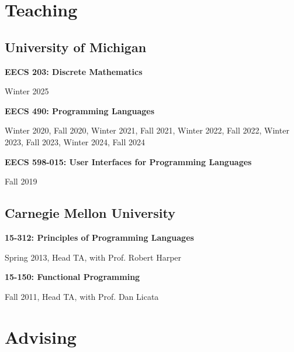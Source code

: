 \documentclass[10pt,letterpaper]{article}
\renewenvironment{itemize}{
  \begin{list}{}{
    \setlength{\leftmargin}{1.25em}
    \setlength{\itemsep}{0.25em}
    \setlength{\parskip}{0pt}
    \setlength{\parsep}{0.2em}
  }
}{
  \end{list}
}
\begin{document}
\section*{Teaching}
\subsection*{University of Michigan}
\begin{itemize}
  \item \textbf{EECS 203: Discrete Mathematics}
      \begin{itemize}
        \item Winter 2025
      \end{itemize}
  \item \textbf{EECS 490: Programming Languages}
        \begin{itemize}
          \item Winter 2020, Fall 2020, Winter 2021, Fall 2021, Winter 2022, Fall 2022, Winter 2023, Fall 2023, Winter 2024, Fall 2024
        \end{itemize}
  \item \textbf{EECS 598-015: User Interfaces for Programming Languages}
        \begin{itemize}
          \item Fall 2019
        \end{itemize}
\end{itemize}

\subsection*{Carnegie Mellon University}
\begin{itemize}
  \item \textbf{15-312: Principles of Programming Languages}
        \begin{itemize}
          \item Spring 2013, Head TA, with Prof. Robert Harper
        \end{itemize}
  \item \textbf{15-150: Functional Programming}
        \begin{itemize}
          \item Fall 2011, Head TA, with Prof. Dan Licata
        \end{itemize}
\end{itemize}


\section*{Advising}
\end{document}
